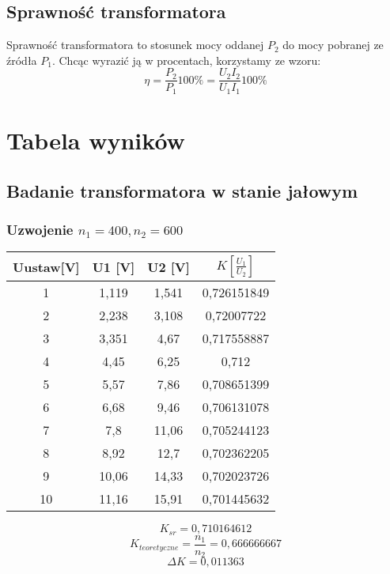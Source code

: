 \documentclass[polish,a4paper]{article}
\begin{document}
\subsection{Sprawność transformatora}
Sprawność transformatora to stosunek mocy oddanej $P_2$ do mocy pobranej ze źródła $P_1$. Chcąc wyrazić ją w procentach, korzystamy ze wzoru:
$$ \eta = \frac{P_2}{P_1}100\% = \frac{U_2I_2}{U_1I_1}100\% $$
\section{Tabela wyników}
\subsection{Badanie transformatora w stanie jałowym}
\subsubsection{Uzwojenie $n_1 = 400, n_2 = 600$}
\begin{table}[H]
\centering
\begin{tabular}{|c|c|c|c|}
\hline
Uustaw[V] &  U1 [V] &  U2 [V] &  $K[\frac{U_1}{U_2}]$ \\
\hline
1 &  1,119 &  1,541 &  0,726151849 \\
2 &  2,238 &  3,108 &  0,72007722 \\
3 &  3,351 &  4,67 &  0,717558887 \\
4 &  4,45 &  6,25 &  0,712 \\
5 &  5,57 &  7,86 &  0,708651399 \\
6 &  6,68 &  9,46 &  0,706131078 \\
7 &  7,8 &  11,06 &  0,705244123 \\
8 &  8,92 &  12,7 &  0,702362205 \\
9 &  10,06 &  14,33 &  0,702023726 \\
10 &  11,16 &  15,91 &  0,701445632 \\
\hline
\end{tabular}
\end{table}

$$K_{sr} = 0,710164612$$
$$K_{teoretyczne} = \frac{n_1}{n_2} = 0,666666667$$
$$\Delta K = 0,011363$$
\end{document}
